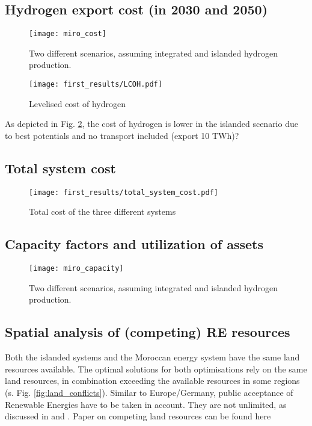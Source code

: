 \subsection{Hydrogen export cost (in 2030 and 2050)}

\begin{figure}[h!]
    \centering
    \texttt{[image: miro\_cost]}
    \caption{Two different scenarios, assuming integrated and islanded hydrogen production.}
    \label{fig:results_costs}
\end{figure}

\begin{figure}[h!]
    \centering
    \texttt{[image: first\_results/LCOH.pdf]}
    \caption{Levelised cost of hydrogen}
    \label{fig:LCOH}
\end{figure}

As depicted in Fig. \ref{fig:LCOH}, the cost of hydrogen is lower in the islanded scenario due to best potentials and no transport included (export 10 TWh)?


\subsection{Total system cost}

\begin{figure}[h!]
    \centering
    \texttt{[image: first\_results/total\_system\_cost.pdf]}
    \caption{Total cost of the three different systems}
    \label{fig:total_system_cost}
\end{figure}

\subsection{Capacity factors and utilization of assets}

\begin{figure}[h!]
    \centering
    \texttt{[image: miro\_capacity]}
    \caption{Two different scenarios, assuming integrated and islanded hydrogen production.}
    \label{fig:results_capacity}
\end{figure}

\subsection{Spatial analysis of (competing) RE resources}
Both the islanded systems and the Moroccan energy system have the same land resources available. 
The optimal solutions for both optimisations rely on the same land resources, in combination exceeding the 
available resources in some regions (s. Fig. \ref{fig:land_conflicts}). 
Similar to Europe/Germany, public acceptance of Renewable Energies have to be taken in account. 
They are not unlimited, as discussed in \cite{Hanger2016} and \cite{TerraponPfaff2019}.
Paper on competing land resources can be found here \cite{Patankar2022}

